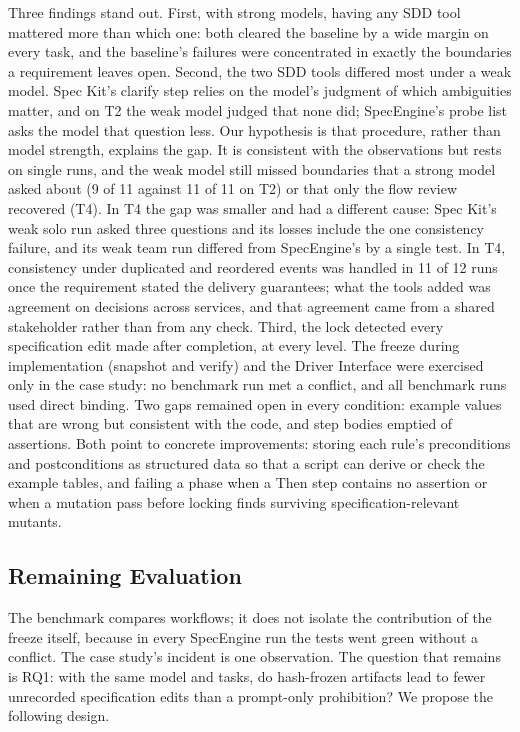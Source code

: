 \documentclass[conference]{IEEEtran}
\begin{document}
Three findings stand out. First, with strong models, having any SDD tool mattered more than which one: both cleared the baseline by a wide margin on every task, and the baseline's failures were concentrated in exactly the boundaries a requirement leaves open. Second, the two SDD tools differed most under a weak model. Spec Kit's clarify step relies on the model's judgment of which ambiguities matter, and on T2 the weak model judged that none did; SpecEngine's probe list asks the model that question less. Our hypothesis is that procedure, rather than model strength, explains the gap. It is consistent with the observations but rests on single runs, and the weak model still missed boundaries that a strong model asked about (9 of 11 against 11 of 11 on T2) or that only the flow review recovered (T4). In T4 the gap was smaller and had a different cause: Spec Kit's weak solo run asked three questions and its losses include the one consistency failure, and its weak team run differed from SpecEngine's by a single test. In T4, consistency under duplicated and reordered events was handled in 11 of 12 runs once the requirement stated the delivery guarantees; what the tools added was agreement on decisions across services, and that agreement came from a shared stakeholder rather than from any check. Third, the lock detected every specification edit made after completion, at every level. The freeze during implementation (snapshot and verify) and the Driver Interface were exercised only in the case study: no benchmark run met a conflict, and all benchmark runs used direct binding. Two gaps remained open in every condition: example values that are wrong but consistent with the code, and step bodies emptied of assertions. Both point to concrete improvements: storing each rule's preconditions and postconditions as structured data so that a script can derive or check the example tables, and failing a phase when a Then step contains no assertion or when a mutation pass before locking finds surviving specification-relevant mutants.

\subsection{Remaining Evaluation}\label{sec:remaining}

The benchmark compares workflows; it does not isolate the contribution of the freeze itself, because in every SpecEngine run the tests went green without a conflict. The case study's incident is one observation. The question that remains is RQ1: with the same model and tasks, do hash-frozen artifacts lead to fewer unrecorded specification edits than a prompt-only prohibition? We propose the following design.
\end{document}
